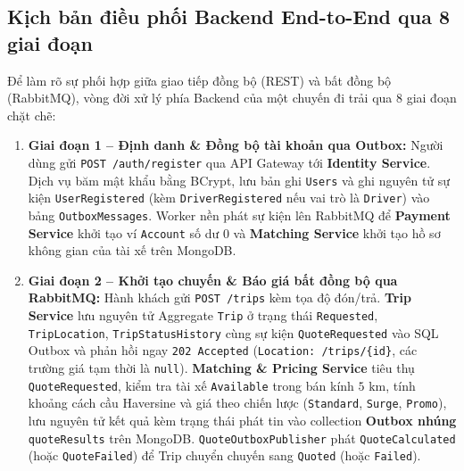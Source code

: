 \documentclass[12pt,a4paper]{article}
\begin{document}
\subsection{Kịch bản điều phối Backend End-to-End qua 8 giai đoạn}
Để làm rõ sự phối hợp giữa giao tiếp đồng bộ (REST) và bất đồng bộ (RabbitMQ), vòng đời xử lý phía Backend của một chuyến đi trải qua 8 giai đoạn chặt chẽ:
\begin{enumerate}[leftmargin=1.6em]
    \item \textbf{Giai đoạn 1 -- Định danh \& Đồng bộ tài khoản qua Outbox:} Người dùng gửi \texttt{POST /auth/register} qua API Gateway tới \textbf{Identity Service}. Dịch vụ băm mật khẩu bằng BCrypt, lưu bản ghi \texttt{Users} và ghi nguyên tử sự kiện \texttt{UserRegistered} (kèm \texttt{DriverRegistered} nếu vai trò là \texttt{Driver}) vào bảng \texttt{OutboxMessages}. Worker nền phát sự kiện lên RabbitMQ để \textbf{Payment Service} khởi tạo ví \texttt{Account} số dư $0$ và \textbf{Matching Service} khởi tạo hồ sơ không gian của tài xế trên MongoDB.
    \item \textbf{Giai đoạn 2 -- Khởi tạo chuyến \& Báo giá bất đồng bộ qua RabbitMQ:} Hành khách gửi \texttt{POST /trips} kèm tọa độ đón/trả. \textbf{Trip Service} lưu nguyên tử Aggregate \texttt{Trip} ở trạng thái \texttt{Requested}, \texttt{TripLocation}, \texttt{TripStatusHistory} cùng sự kiện \texttt{QuoteRequested} vào SQL Outbox và phản hồi ngay \texttt{202 Accepted} (\texttt{Location: /trips/\{id\}}, các trường giá tạm thời là \texttt{null}). \textbf{Matching \& Pricing Service} tiêu thụ \texttt{QuoteRequested}, kiểm tra tài xế \texttt{Available} trong bán kính $5\text{ km}$, tính khoảng cách cầu Haversine và giá theo chiến lược (\texttt{Standard}, \texttt{Surge}, \texttt{Promo}), lưu nguyên tử kết quả kèm trạng thái phát tin vào collection \textbf{Outbox nhúng} \texttt{quoteResults} trên MongoDB. \texttt{QuoteOutboxPublisher} phát \texttt{QuoteCalculated} (hoặc \texttt{QuoteFailed}) để Trip chuyển chuyến sang \texttt{Quoted} (hoặc \texttt{Failed}).

\end{enumerate}
\end{document}
